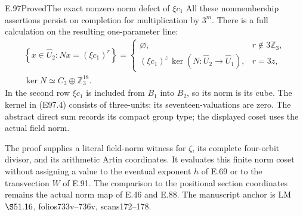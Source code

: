 \begin{statement}{E.97}{Proved}{The exact nonzero norm defect of \(\xi c_1\)}
All these nonmembership assertions persist on completion
for multiplication by \(3^m\). There is a full calculation on
the resulting one-parameter line:
\[
 \begin{gathered}
 \left\{x\in\widehat U_2:Nx=(\xi c_1)^r\right\}
 =
 \begin{cases}
 \varnothing,&r\notin3\mathbb Z_3,\\
 (\xi c_1)^z\,\ker(N:\widehat U_2\to\widehat U_1),
       &r=3z,
 \end{cases}\\
 \ker N\simeq C_3\oplus\mathbb Z_3^{18}.
 \end{gathered}
 \tag{E97.4}
\]
In the second row \(\xi c_1\) is included from \(B_1\) into
\(B_2\), so its norm is its cube. The kernel in (E97.4)
consists of three-units: its seventeen-valuations are zero.
The abstract direct sum records its compact group type;
the displayed coset uses the actual field norm.

The proof supplies a literal field-norm witness for \(\zeta\),
its complete four-orbit divisor, and its arithmetic Artin
coordinates. It evaluates this finite norm coset without
assigning a value to the eventual exponent \(h\) of E.69
or to the transvection \(W\) of E.91. The comparison to the
positional section coordinates remains the actual norm map
of E.46 and E.88. The manuscript anchor is
LM \(\S51.16\), folios733v--736v, scans172--178.
\end{statement}

